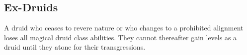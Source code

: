     \subsection{Ex-Druids}
        A druid who ceases to revere nature or who changes to a prohibited alignment loses all magical druid class abilities.
        They cannot thereafter gain levels as a druid until they atone for their transgressions.







